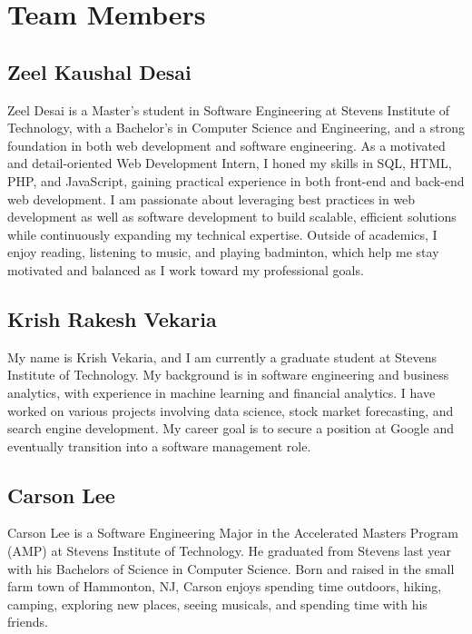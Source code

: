 




\section{Team Members}
\subsection{Zeel Kaushal Desai}
Zeel Desai is a Master’s student in Software Engineering at Stevens Institute of Technology, with a Bachelor’s in Computer Science and Engineering, and a strong foundation in both web development and software engineering. As a motivated and detail-oriented Web Development Intern, I honed my skills in SQL, HTML, PHP, and JavaScript, gaining practical experience in both front-end and back-end web development. I am passionate about leveraging best practices in web development as well as software development to build scalable, efficient solutions while continuously expanding my technical expertise. Outside of academics, I enjoy reading, listening to music, and playing badminton, which help me stay motivated and balanced as I work toward my professional goals.

\subsection{Krish Rakesh Vekaria}
My name is Krish Vekaria, and I am currently a graduate student at Stevens Institute of Technology. My background is in software engineering and business analytics, with experience in machine learning and financial analytics. I have worked on various projects involving data science, stock market forecasting, and search engine development. My career goal is to secure a position at Google and eventually transition into a software management role.

\subsection{Carson Lee}
Carson Lee is a Software Engineering Major in the Accelerated Masters Program (AMP) at Stevens Institute of Technology. He graduated from Stevens last year with his Bachelors of Science in Computer Science. Born and raised in the small farm town of Hammonton, NJ, Carson enjoys spending time outdoors, hiking, camping, exploring new places, seeing musicals, and spending time with his friends.

